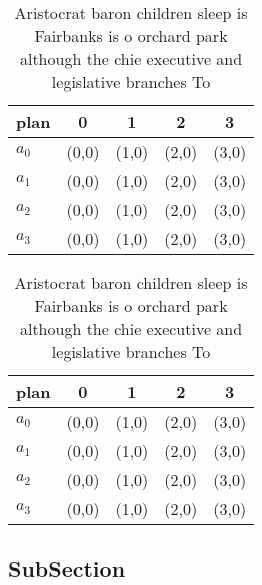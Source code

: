 \documentclass[a4paper]{article}
\begin{document}
\begin{table}
\begin{adjustbox}{width=1\columnwidth}
\begin{tabular}{|l|l|l|l|l|}
\hline
\textbf{plan} & \multicolumn{1}{c|}{\textbf{0}} & \multicolumn{1}{c|}{\textbf{1}} & \multicolumn{1}{c|}{\textbf{2}} & \multicolumn{1}{c|}{\textbf{3}} \\ \hline
\textbf{$a_0$}  & (0,0) & (1,0) & (2,0) & (3,0) \\ \hline
\textbf{$a_1$}  & (0,0) & (1,0) & (2,0) & (3,0) \\ \hline
\textbf{$a_2$}  & (0,0) & (1,0) & (2,0) & (3,0) \\ \hline
\textbf{$a_3$}  & (0,0) & (1,0) & (2,0) & (3,0) \\ \hline
\end{tabular}
\end{adjustbox}
\caption{Aristocrat baron children sleep is Fairbanks is o orchard park although the chie executive and legislative branches To 
}
\end{table}

\begin{table}
\begin{adjustbox}{width=1\columnwidth}
\begin{tabular}{|l|l|l|l|l|}
\hline
\textbf{plan} & \multicolumn{1}{c|}{\textbf{0}} & \multicolumn{1}{c|}{\textbf{1}} & \multicolumn{1}{c|}{\textbf{2}} & \multicolumn{1}{c|}{\textbf{3}} \\ \hline
\textbf{$a_0$}  & (0,0) & (1,0) & (2,0) & (3,0) \\ \hline
\textbf{$a_1$}  & (0,0) & (1,0) & (2,0) & (3,0) \\ \hline
\textbf{$a_2$}  & (0,0) & (1,0) & (2,0) & (3,0) \\ \hline
\textbf{$a_3$}  & (0,0) & (1,0) & (2,0) & (3,0) \\ \hline
\end{tabular}
\end{adjustbox}
\caption{Aristocrat baron children sleep is Fairbanks is o orchard park although the chie executive and legislative branches To 
}
\end{table}

\subsection{SubSection}
\end{document}
